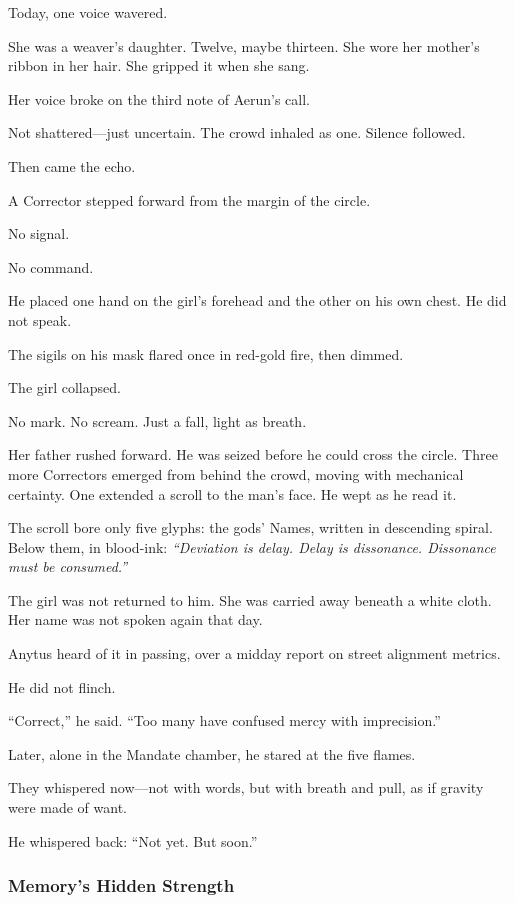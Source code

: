 \documentclass[12pt]{article}
\begin{document}
Today, one voice wavered.

She was a weaver’s daughter. Twelve, maybe thirteen. She wore her mother’s ribbon in her hair. She gripped it when she sang.

Her voice broke on the third note of Aerun’s call. 

Not shattered—just uncertain. The crowd inhaled as one. Silence followed.

Then came the echo.

A Corrector stepped forward from the margin of the circle. 

No signal. 

No command. 

He placed one hand on the girl’s forehead and the other on his own chest. He did not speak. 

The sigils on his mask flared once in red-gold fire, then dimmed.

The girl collapsed.

No mark. No scream. Just a fall, light as breath.

Her father rushed forward. He was seized before he could cross the circle. Three more Correctors emerged from behind the crowd, moving with mechanical certainty. One extended a scroll to the man’s face. He wept as he read it.

The scroll bore only five glyphs: the gods’ Names, written in descending spiral. Below them, in blood-ink: \textit{“Deviation is delay. Delay is dissonance. Dissonance must be consumed.”}

The girl was not returned to him. She was carried away beneath a white cloth. Her name was not spoken again that day.

Anytus heard of it in passing, over a midday report on street alignment metrics. 

He did not flinch. 

“Correct,” he said. “Too many have confused mercy with imprecision.”

Later, alone in the Mandate chamber, he stared at the five flames.

They whispered now—not with words, but with breath and pull, as if gravity were made of want.

He whispered back: “Not yet. But soon.”

\dotfill

\subsubsection*{Memory's Hidden Strength}
\end{document}
